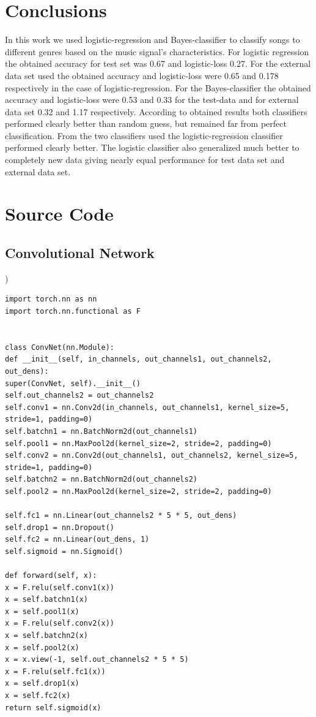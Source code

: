 \documentclass[aps,prb,10pt,twocolumn,groupedaddress]{revtex4-1}
\begin{document}
\section{Conclusions}
\label{sec:conclusions}
In this work we used logistic-regression and Bayes-classifier to classify songs
to different genres based on the music signal's characteristics. For logistic
regression the obtained accuracy for test set was 0.67 and logistic-loss 0.27.
For the external data set used the obtained accuracy and logistic-loss were 0.65
and 0.178 respectively in the case of logistic-regression. For the
Bayes-classifier the obtained accuracy and logistic-loss were 0.53 and 0.33 for
the test-data and for external data set 0.32 and 1.17 respectively. According to
obtained results both classifiers performed clearly better than random guess,
but remained far from perfect classification. From the two classifiers used
the logistic-regression classifier performed clearly better. The logistic
classifier also generalized much better to completely new data giving nearly
equal performance for test data set and external data set.


\appendix
\onecolumngrid
\section{Source Code}
\label{appendix:a}
\lstset{language=Python}
\subsection{Convolutional Network})
\begin{lstlisting}
import torch.nn as nn
import torch.nn.functional as F


class ConvNet(nn.Module):
def __init__(self, in_channels, out_channels1, out_channels2, out_dens):
super(ConvNet, self).__init__()
self.out_channels2 = out_channels2
self.conv1 = nn.Conv2d(in_channels, out_channels1, kernel_size=5, stride=1, padding=0)
self.batchn1 = nn.BatchNorm2d(out_channels1)
self.pool1 = nn.MaxPool2d(kernel_size=2, stride=2, padding=0)
self.conv2 = nn.Conv2d(out_channels1, out_channels2, kernel_size=5, stride=1, padding=0)
self.batchn2 = nn.BatchNorm2d(out_channels2)
self.pool2 = nn.MaxPool2d(kernel_size=2, stride=2, padding=0)

self.fc1 = nn.Linear(out_channels2 * 5 * 5, out_dens)
self.drop1 = nn.Dropout()
self.fc2 = nn.Linear(out_dens, 1)
self.sigmoid = nn.Sigmoid()

def forward(self, x):
x = F.relu(self.conv1(x))
x = self.batchn1(x)
x = self.pool1(x)
x = F.relu(self.conv2(x))
x = self.batchn2(x)
x = self.pool2(x)
x = x.view(-1, self.out_channels2 * 5 * 5)
x = F.relu(self.fc1(x))
x = self.drop1(x)
x = self.fc2(x)
return self.sigmoid(x)
\end{lstlisting}
\end{document}

